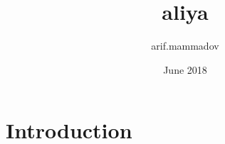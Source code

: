 \documentclass{article}
\title{aliya}
\author{arif.mammadov }
\date{June 2018}
\begin{document}
\maketitle

\section{Introduction}
\end{document}
